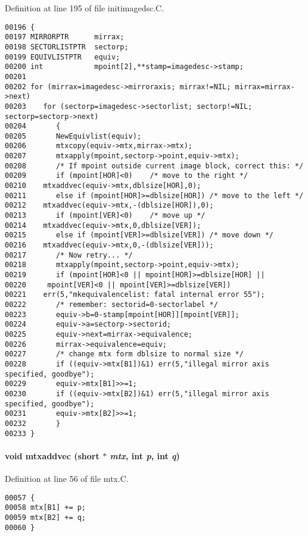 Definition at line 195 of file initimagedsc.C.\small\begin{verbatim}00196 {
00197 MIRRORPTR      mirrax;
00198 SECTORLISTPTR  sectorp;
00199 EQUIVLISTPTR   equiv;
00200 int            mpoint[2],**stamp=imagedesc->stamp;
00201 
00202 for (mirrax=imagedesc->mirroraxis; mirrax!=NIL; mirrax=mirrax->next)
00203    for (sectorp=imagedesc->sectorlist; sectorp!=NIL; sectorp=sectorp->next)
00204       {
00205       NewEquivlist(equiv);
00206       mtxcopy(equiv->mtx,mirrax->mtx);
00207       mtxapply(mpoint,sectorp->point,equiv->mtx);
00208       /* If mpoint outside current image block, correct this: */
00209       if (mpoint[HOR]<0)    /* move to the right */
00210    mtxaddvec(equiv->mtx,dblsize[HOR],0);
00211       else if (mpoint[HOR]>=dblsize[HOR]) /* move to the left */
00212    mtxaddvec(equiv->mtx,-(dblsize[HOR]),0);
00213       if (mpoint[VER]<0)    /* move up */
00214    mtxaddvec(equiv->mtx,0,dblsize[VER]);
00215       else if (mpoint[VER]>=dblsize[VER]) /* move down */
00216    mtxaddvec(equiv->mtx,0,-(dblsize[VER]));
00217       /* Now retry... */
00218       mtxapply(mpoint,sectorp->point,equiv->mtx);
00219       if (mpoint[HOR]<0 || mpoint[HOR]>=dblsize[HOR] ||
00220     mpoint[VER]<0 || mpoint[VER]>=dblsize[VER])
00221    err(5,"mkequivalencelist: fatal internal error 55");
00222       /* remember: sectorid=0-sectorlabel */
00223       equiv->b=0-stamp[mpoint[HOR]][mpoint[VER]];
00224       equiv->a=sectorp->sectorid;
00225       equiv->next=mirrax->equivalence;
00226       mirrax->equivalence=equiv;
00227       /* change mtx form dblsize to normal size */
00228       if ((equiv->mtx[B1])&1) err(5,"illegal mirror axis specified, goodbye");
00229       equiv->mtx[B1]>>=1;
00230       if ((equiv->mtx[B2])&1) err(5,"illegal mirror axis specified, goodbye");
00231       equiv->mtx[B2]>>=1;
00232       }
00233 }
\end{verbatim}\normalsize 
\label{im.h_a6}
\paragraph{\setlength{\rightskip}{0pt plus 5cm}void mtxaddvec (short $\ast$ {\em mtx}, int {\em p}, int {\em q})}\hfill



Definition at line 56 of file mtx.C.\small\begin{verbatim}00057 {
00058 mtx[B1] += p;
00059 mtx[B2] += q;
00060 }
\end{verbatim}\normalsize 
\label{im.h_a5}
